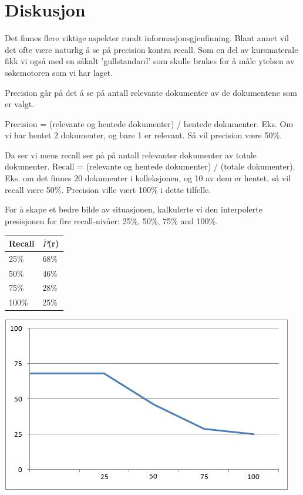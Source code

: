 \section{Diskusjon}
\label{sec:diskusjon}

Det finnes flere viktige aspekter rundt informasjonsgjenfinning. Blant annet vil det ofte være naturlig å se på precision kontra recall. Som en del av kursmaterale fikk vi også med en såkalt 'gullstandard' som skulle brukes for å måle ytelsen av søkemotoren som vi har laget.

Precision går på det å se på antall relevante dokumenter av de dokumentene som er valgt. 

Precision = (relevante og hentede dokumenter) / hentede dokumenter. Eks. Om vi har hentet 2 dokumenter, og bare 1 er relevant. Så vil precision være 50\%.

Da ser vi mens recall ser på på antall relevanter dokumenter av totale dokumenter. Recall = (relevante og hentede dokumenter) / (totale dokumenter). Eks. om det finnes 20 dokumenter i kolleksjonen, og 10 av dem er hentet, så vil recall være 50\%. Precision ville vært 100\% i dette tilfelle. 


For å skape et bedre bilde av situasjonen, kalkulerte vi den interpolerte presisjonen for fire recall-nivåer: 25\%, 50\%, 75\% and 100\%.

\begin{center}
\begin{tabular}{|m{}|m{}|}
\hline
Recall & $\overline{P}$(r) \\ \hline
25\% & 68\% \\ \hline
50\% & 46\% \\ \hline
75\% & 28\% \\ \hline
100\% & 25\% \\ \hline
\end{tabular}
\end{center}

\begin{center}
\includegraphics{section/recallgraf}
\end{center}



